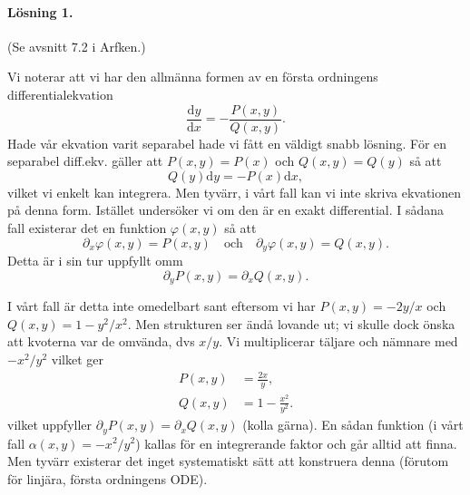 \documentclass[%
oneside,                 %
final,                   %
10pt]{article}
\newenvironment{notice_mdfboxadmon}[1][]{
\begin{notice_mdfboxmdframed}[frametitle=#1]
}
{
\end{notice_mdfboxmdframed}
}
\begin{document}
\begin{notice_mdfboxadmon}
\paragraph{Lösning 1.}
(Se avsnitt 7.2 i Arfken.)

Vi noterar att vi har den allmänna formen av en första ordningens differentialekvation
\begin{equation}
\frac{\mbox{d}y}{\mbox{d}x} = - \frac{P(x,y)}{Q(x,y)}.
\end{equation}
Hade vår ekvation varit separabel hade vi fått en väldigt snabb lösning. För en separabel diff.ekv. gäller att $P(x,y)=P(x)$ och $Q(x,y)=Q(y)$ så att
\begin{equation}
Q(y) \mbox{d}y = -P(x) \mbox{d}x,
\end{equation}
vilket vi enkelt kan integrera. Men tyvärr, i vårt fall kan vi inte skriva ekvationen på denna form. Istället undersöker vi om den är en exakt differential. I sådana fall existerar det en funktion $\varphi(x,y)$ så att
\begin{equation}
\partial_x \varphi(x,y) = P(x,y) \quad \mathrm{och} \quad \partial_y \varphi(x,y) = Q(x,y).
\end{equation}
Detta är i sin tur uppfyllt omm
\begin{equation}
\partial_y P(x,y) = \partial_x Q(x,y).
\label{exaktdiff}
\end{equation}

I vårt fall är detta inte omedelbart sant eftersom vi har $P(x,y) = - 2y/x$ och $Q(x,y) = 1-y^2/x^2$. Men strukturen ser ändå lovande ut; vi skulle dock önska att kvoterna var de omvända, dvs $x/y$. Vi multiplicerar täljare och nämnare med $-x^2/y^2$ vilket ger
\begin{align}
P(x,y) &= \frac{2x}{y},\\ 
Q(x,y) &= 1 - \frac{x^2}{y^2}.
\end{align}
vilket uppfyller $\partial_y P(x,y) = \partial_x Q(x,y)$ (kolla gärna). En sådan funktion (i vårt fall $\alpha(x,y) = -x^2/y^2$) kallas för en integrerande faktor och går alltid att finna. Men tyvärr existerar det inget systematiskt sätt att konstruera denna (förutom för linjära, första ordningens ODE).


\end{notice_mdfboxadmon}
\end{document}
